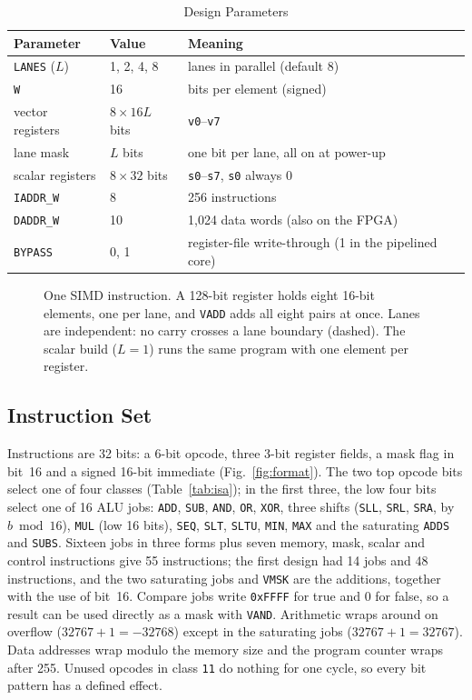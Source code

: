 \begin{table}[t]
\centering
\caption{Design Parameters}
\label{tab:params}
\footnotesize
\begin{tabular}{llL{0.48\columnwidth}}
\toprule
Parameter & Value & Meaning \\
\midrule
\texttt{LANES} ($L$) & 1, 2, 4, 8 & lanes in parallel (default 8) \\
\texttt{W}           & 16         & bits per element (signed) \\
vector registers     & $8 \times 16L$ bits & \texttt{v0}--\texttt{v7} \\
lane mask            & $L$ bits   & one bit per lane, all on at power-up \\
scalar registers     & $8 \times 32$ bits  & \texttt{s0}--\texttt{s7}, \texttt{s0} always 0 \\
\texttt{IADDR\_W}    & 8          & 256 instructions \\
\texttt{DADDR\_W}    & 10         & 1,024 data words (also on the FPGA) \\
\texttt{BYPASS}      & 0, 1       & register-file write-through (1 in the pipelined core) \\
\bottomrule
\end{tabular}
\end{table}

\begin{figure}[t]
\centering

\caption{One SIMD instruction. A 128-bit register holds eight 16-bit elements, one per
lane, and \texttt{VADD} adds all eight pairs at once. Lanes are independent: no carry
crosses a lane boundary (dashed). The scalar build ($L = 1$) runs the same program with
one element per register.}
\label{fig:lanes}
\end{figure}

\subsection{Instruction Set}\label{sec:isa}
Instructions are 32 bits: a 6-bit opcode, three 3-bit register fields, a mask flag in
bit~16 and a signed 16-bit immediate (Fig.~\ref{fig:format}). The two top opcode bits
select one of four classes (Table~\ref{tab:isa}); in the first three, the low four bits
select one of 16 ALU jobs: \texttt{ADD}, \texttt{SUB}, \texttt{AND}, \texttt{OR},
\texttt{XOR}, three shifts (\texttt{SLL}, \texttt{SRL}, \texttt{SRA}, by $b \bmod 16$),
\texttt{MUL} (low 16 bits), \texttt{SEQ}, \texttt{SLT}, \texttt{SLTU}, \texttt{MIN},
\texttt{MAX} and the saturating \texttt{ADDS} and \texttt{SUBS}. Sixteen jobs in three
forms plus seven memory, mask, scalar and control instructions give 55 instructions;
the first design had 14 jobs and 48 instructions, and the two saturating jobs and
\texttt{VMSK} are the additions, together with the use of bit~16. Compare jobs write
\texttt{0xFFFF} for true and 0 for false, so a result can be used directly as a mask with
\texttt{VAND}. Arithmetic wraps around on overflow ($32767 + 1 = -32768$) except in the
saturating jobs ($32767 + 1 = 32767$). Data addresses wrap modulo the memory size and the
program counter wraps after 255. Unused opcodes in class \texttt{11} do nothing for one
cycle, so every bit pattern has a defined effect.

